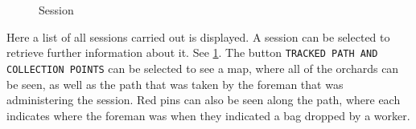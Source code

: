 \documentclass[11pt]{article}
\begin{document}
\begin{figure}
 \centering
 \qquad
 \caption{Session}
 \label{Mobile Session}
\end{figure}

Here a list of all sessions carried out is displayed. A session can be selected to retrieve further information about it. See \ref{Mobile Session}. The button \texttt{TRACKED PATH AND COLLECTION POINTS} can be selected to see a map, where all of the orchards can be seen, as well as the path that was taken by the foreman that was administering the session. Red pins can also be seen along the path, where each indicates where the foreman was when they indicated a bag dropped by a worker.
\end{document}
